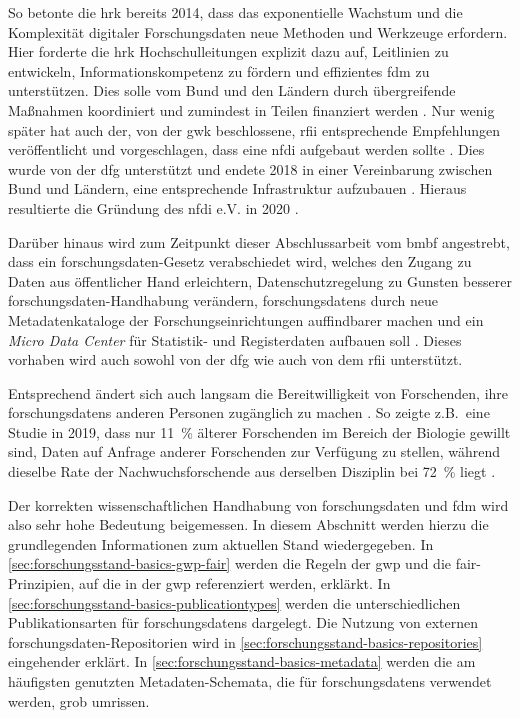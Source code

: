 So betonte die \gls{hrk} bereits 2014, dass das exponentielle Wachstum und die Komplexität digitaler Forschungsdaten neue Methoden und Werkzeuge erfordern.
Hier forderte die \gls{hrk} Hochschulleitungen explizit dazu auf, Leitlinien zu entwickeln, Informationskompetenz zu fördern und effizientes \gls{fdm} zu unterstützen.
Dies solle vom Bund und den Ländern durch übergreifende Maßnahmen koordiniert und zumindest in Teilen finanziert werden \autocite{hrk-fdm}.
Nur wenig später hat auch der, von der \gls{gwk} beschlossene, \gls{rfii} entsprechende Empfehlungen veröffentlicht und vorgeschlagen, dass eine \gls{nfdi} aufgebaut werden sollte \autocite{rfii2016}.
Dies wurde von der \gls{dfg} unterstützt \autocite{dfg-positionspapier} und endete 2018 in einer Vereinbarung zwischen Bund und Ländern, eine entsprechende Infrastruktur aufzubauen \autocite{nfdi-agreement}.
Hieraus resultierte die Gründung des \gls{nfdi} e.V. in 2020 \autocite{nfdi-foundation}.

Darüber hinaus wird zum Zeitpunkt dieser Abschlussarbeit vom \gls{bmbf} angestrebt, dass ein \gls{forschungsdaten}-Gesetz verabschiedet wird, welches den Zugang zu Daten aus öffentlicher Hand erleichtern, Datenschutzregelung zu Gunsten besserer \gls{forschungsdaten}-Handhabung verändern, \glspl{forschungsdaten} durch neue Metadatenkataloge der Forschungseinrichtungen auffindbarer machen und ein \textit{Micro Data Center} für Statistik- und Registerdaten aufbauen soll \autocite{bmbf2024}.
Dieses vorhaben wird auch sowohl von der \gls{dfg} \autocite{dfg2023-gesetz} wie auch von dem \gls{rfii} \autocite{rfii-gesetz} unterstützt.

Entsprechend ändert sich auch langsam die Bereitwilligkeit von Forschenden, ihre \glspl{forschungsdaten} anderen Personen zugänglich zu machen \autocite{Kaden2018}.
So zeigte z.B.~eine Studie in 2019, dass nur \SI{11}{\percent} älterer Forschenden im Bereich der Biologie gewillt sind, Daten auf Anfrage anderer Forschenden zur Verfügung zu stellen, während dieselbe Rate der Nachwuchsforschende aus derselben Disziplin bei \SI{72}{\percent} liegt \autocite{Campbell2019}.


Der korrekten wissenschaftlichen Handhabung von \gls{forschungsdaten} und \gls{fdm} wird also sehr hohe Bedeutung beigemessen.
In diesem Abschnitt werden hierzu die grundlegenden Informationen zum aktuellen Stand wiedergegeben.
In \cref{sec:forschungsstand-basics-gwp-fair} werden die Regeln der \gls{gwp} und die \gls{fair}-Prinzipien, auf die in der \gls{gwp} referenziert werden, erklärkt.
In \cref{sec:forschungsstand-basics-publicationtypes} werden die unterschiedlichen Publikationsarten für \glspl{forschungsdaten} dargelegt.
Die Nutzung von externen \gls{forschungsdaten}-Repositorien wird in \cref{sec:forschungsstand-basics-repositories} eingehender erklärt.
In \cref{sec:forschungsstand-basics-metadata} werden die am häufigsten genutzten Metadaten-Schemata, die für \glspl{forschungsdaten} verwendet werden, grob umrissen.


